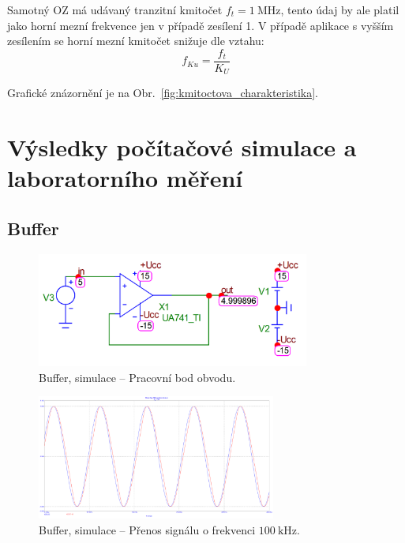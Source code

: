 \documentclass{protokol}
\begin{document}
	Samotný OZ má udávaný tranzitní kmitočet $ f_t=\SI{1}{\mega\hertz} $, tento údaj by ale platil jako horní mezní frekvence jen v případě zesílení 1. V případě aplikace s vyšším zesílením se horní mezní kmitočet snižuje dle vztahu:
	$$ f_{Ku} = \frac{f_t}{K_U}$$ 

	Grafické znázornění je na Obr.~\ref{fig:kmitoctova_charakteristika}.	
	
	
%	
	
	\newpage
\section{Výsledky počítačové simulace a laboratorního měření}
\subsection{Buffer}

	\begin{figure}[h!]
		\centering
		\includegraphics[width=0.8\textwidth]{numerika/Buffer/1_PracBod.png}
		\centering
		\caption{Buffer, simulace -- Pracovní bod obvodu.}
		\label{fig:mc_bt_prac_bod}
	\end{figure}

	\begin{figure}[h!]
		\centering
		\includegraphics[width=0.7\textwidth]{numerika/Buffer/3_100k_sin_1V.png}
		\centering
		\caption{Buffer, simulace -- Přenos signálu o frekvenci $ \qty{100}{\kilo\hertz} $.}
		\label{fig:b-s-prenos1}
	\end{figure}
	
\end{document}

